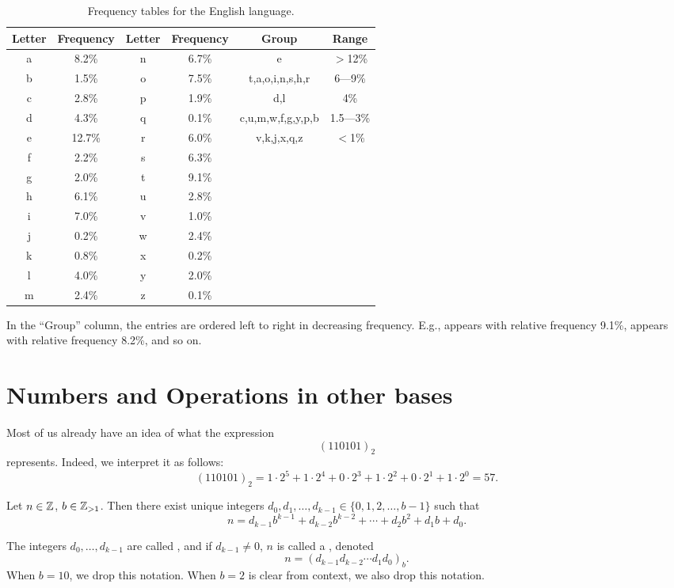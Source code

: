 \begin{table}[!h]\label{tab:freqanalysis}
\centering
\caption{Frequency tables for the English language.}
\begin{footnotesize}
\begin{tabular}{| c | c | c | c || c | c |}
\hline
Letter & Frequency & Letter & Frequency & Group & Range\\
\hline
a & 8.2\%   & n & 6.7\% & e                 & $>$12\% \\
b & 1.5\%   & o& 7.5\%  & t,a,o,i,n,s,h,r   & 6---9\%\\
c & 2.8\%   & p & 1.9\% & d,l               & 4\% \\
d & 4.3\%   & q & 0.1\% & c,u,m,w,f,g,y,p,b & 1.5---3\% \\
e & 12.7\%  & r & 6.0\% & v,k,j,x,q,z       & $<$1\% \\
f & 2.2\%   & s &6.3\%  &&\\
g & 2.0\%   & t &9.1\%  &&\\
h & 6.1\%   & u &2.8\%  &&\\
i & 7.0\%   & v &1.0\%  &&\\
j & 0.2\%   & w &2.4\%  &&\\
k & 0.8\%   & x &0.2\%  &&\\
l & 4.0\%   & y & 2.0\% &&\\
m & 2.4\%   & z & 0.1\% &&\\
\hline
\end{tabular}

In the ``Group'' column, the entries are ordered left to right in decreasing frequency.  E.g.,  appears with relative frequency 9.1\%,  appears with relative frequency 8.2\%, and so on.
\end{footnotesize}
\label{tab:freq-table}
\end{table}

\section{Numbers and Operations in other bases}

Most of us already have an idea of what the expression \[
(110101)_2\]
represents.  Indeed, we interpret it as follows:\[
(110101)_2 = 1\cdot 2^5 + 1\cdot 2^4 + 0\cdot2^3 +1 \cdot 2^2 + 0\cdot 2^1 + 1\cdot 2^0 = 57.
\]

\begin{definition} Let $n \in \mathbb{Z}$, $b \in \mathbb{Z}_{> 1}$.  Then there exist unique integers $d_0, d_1, \ldots, d_{k-1} \in \{0, 1, 2, \ldots, b-1\}$ such that \[
n = d_{k-1} b^{k-1} + d_{k-2}b^{k-2} + \cdots + d_{2} b^2 + d_1 b + d_0.\]

The integers $d_0, \ldots, d_{k-1}$ are called , and if $d_{k-1} \not = 0$, $n$ is called a , denoted
\[ n = \left(d_{k-1} d_{k-2} \cdots d_1 d_0\right)_b.\]
When $b = 10$, we drop this notation.  When $b = 2$ is clear from context, we also drop this notation.
\end{definition}

